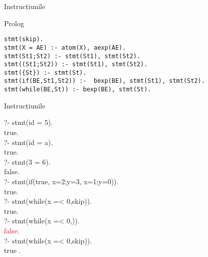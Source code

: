 \documentclass[xcolor=x11names,compress,10pt]{beamer}
\begin{document}
\begin{frame}[fragile]{Instrucțiunile}

 \vspace{-5ex}
  
\begin{block}{Prolog}


\begin{verbatim}
stmt(skip).
stmt(X = AE) :- atom(X), aexp(AE).
stmt(St1;St2) :- stmt(St1), stmt(St2).  
stmt((St1;St2)) :- stmt(St1), stmt(St2).  
stmt({St}) :- stmt(St).
stmt(if(BE,St1,St2)) :-  bexp(BE), stmt(St1), stmt(St2).
stmt(while(BE,St)) :- bexp(BE), stmt(St).
\end{verbatim}
\end{block}
\end{frame}

\begin{frame}[fragile]{Instrucțiunile}
\begin{example}
?- stmt(id = 5).\\
true.\\

?- stmt(id = a).\\
true.\\

?- stmt(3 = 6).\\
false.\\

?- stmt(if(true, x=2;y=3, x=1;y=0)).\\
true.\\

?- stmt(while(x =< 0,skip)).\\
true.\\


?- stmt(while(x =< 0,{})).\\
\textcolor{red}{false.}\\

?- stmt(while(x =< 0,{skip})).\\
true .
\end{example}
\end{frame}
\end{document}
